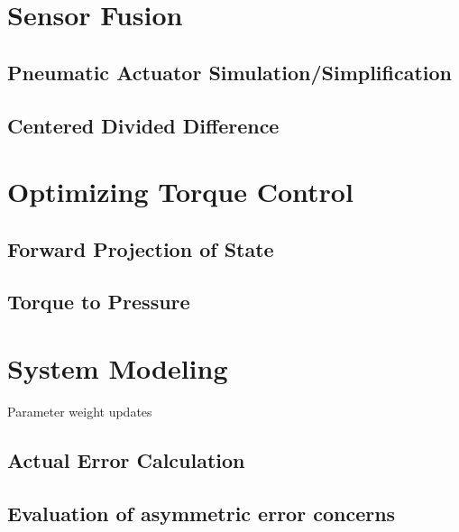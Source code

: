 \section{Sensor Fusion}

\subsection{Pneumatic Actuator Simulation/Simplification}

\subsection{Centered Divided Difference}

\section{Optimizing Torque Control}

\subsection{Forward Projection of State}

\subsection{Torque to Pressure}

\section{System Modeling}

Parameter weight updates

\subsection{Actual Error Calculation}

\subsection{Evaluation of asymmetric error concerns}